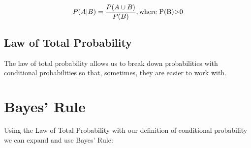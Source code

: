 \documentclass{report}
\begin{document}
        \begin{equation*}
            P(A|B) = \frac{P(A\cup B)}{P(B)}, \textnormal{where P(B)>0}
        \end{equation*}

        \subsection{Law of Total Probability}

        The law of total probability allows us to break down probabilities with conditional probabilities so that, sometimes, they are easier to work with. 


        \section{Bayes' Rule}
        Using the Law of Total Probability with our definition of conditional probability we can expand and use Bayes' Rule:
\end{document}
